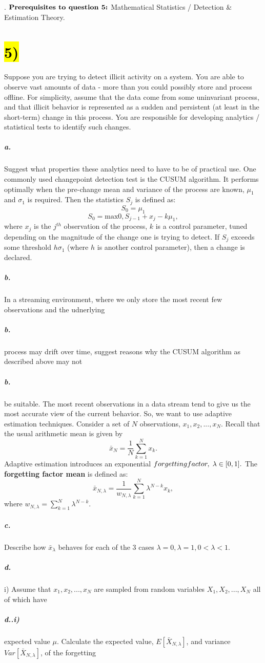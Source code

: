 \documentclass[11pt]{article}
\newcommand{\mm}[1]{\hspace{#1mm}}
\newcommand{\pnewline}[1]{\vspace*{-\baselineskip}\subparagraph*{{\color{white} #1}}}
\newcommand{\skipnewline}{\vspace*{-\baselineskip}}
\newcommand{\newnew}{\newline\newline}
\begin{document}
{%

{\color{white}.}\newline
$\text{\bf {Prerequisites to question 5:}}$ Mathematical Statistics / Detection \& Estimation Theory.
\section*{\hl{5)}} Suppose you are trying to detect illicit activity on a system. You are able to observe vast amounts of data - more than you could possibly store and process offline. For simplicity, assume that the data come from some uninvariant process, and that illicit behavior is represented as a sudden and persistent (at least in the short-term) change in this process. You are responsible for developing analytics / statistical tests to identify such changes.
\subparagraph*{a.} Suggest what properties these analytics need to have to be of practical use. \newnew
One commonly used changepoint detection test is the CUSUM algorithm. It performs optimally when the pre-change mean and variance of the process are known, $\mu_1$ and $\sigma_1$ is required. Then the statistics $S_j$ is defined as:
$$S_0 = \mu_1$$
$$S_0 = \text{max}0, S_{j-1} + x_j - k\mu_1,$$
where $x_j$ is the $j^{th}$ observation of the process, $k$ is a control parameter, tuned depending on the magnitude of the change one is trying to detect. If $S_j$ exceeds some threshold $h\sigma_1$ (where $h$ is another control parameter), then a change is declared.
\subparagraph*{b.} In a streaming environment, where we only store the most recent few observations and the udnerlying \pnewline{b.}process may drift over time, suggest reasons why the CUSUM algorithm as described above may not \pnewline{b.}be suitable. \newnew
The most recent observations in a data stream tend to give us the most accurate view of the current behavior. So, we want to use adaptive estimation techniques. Consider a set of $N$ observations, $x_1, x_2, ... , x_N$. Recall that the usual arithmetic mean is given by 
$$\bar{x}_N = \frac{1}{N}\sum_{k = 1}^N x_k.$$
Adaptive estimation introduces an exponential $forgetting factor, \mm{1}\lambda \in [0,1].$ The \textbf{forgetting factor mean} is defined as: 
$$\bar{x}_{N,\lambda} = \frac{1}{w_{N,\lambda}}\sum_{k = 1}^N \lambda^{N-k}x_k,$$
where $w_{N,\lambda} = \sum_{k = 1}^N \lambda^{N-k}$.
\subparagraph*{c.} Describe how $\bar{x}_{\lambda}$ behaves for each of the 3 cases $\lambda = 0 , \lambda = 1, 0 < \lambda < 1$.
\subparagraph*{d.} i) Assume that $x_1, x_2, ... , x_N$ are sampled from random variables $X_1, X_2, ... , X_N$ all of which have \pnewline{d..i)}}expected value $\mu$. Calculate the expected value, $E[\bar{X}_{N,\lambda}]$, and variance $Var[\bar{X}_{N,\lambda}]$, of the forgetting \skipnewline
\end{document}
